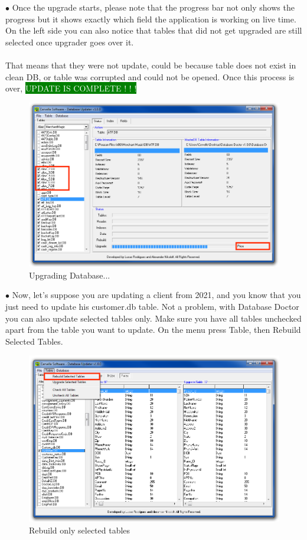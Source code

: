 \documentclass[a4paper, 11pt]{article}
\begin{document}
\vspace*{\fill}
$\bullet$ Once the upgrade starts, please note that the progress bar not only shows the progress but it shows exactly which field the application is working on live time. On the left side you can also notice that tables that did not get upgraded are still selected once upgrader goes over it. \\\\
That means that they were not update, could be because table does not exist in clean DB, or table was corrupted and could not be opened. Once this process is over, \colorbox{Green}{\textcolor{White}{UPDATE IS COMPLETE ! ! !}}
\begin{figure}[h]
    \centering
     \includegraphics[width=\textwidth]{capture 30}
    \caption{Upgrading Database...}
\end{figure}
\vspace*{\fill}

\pagebreak

\vspace*{\fill}
$\bullet$ Now, let's suppose you are updating a client from 2021, and you know that you just need to update his customer.db table. Not a problem, with Database Doctor you can also update selected tables only. Make sure you have all tables unchecked apart from the table you want to update. On the menu press Table, then Rebuild Selected Tables.
\begin{figure}[h]
    \centering
     \includegraphics[width=\textwidth]{capture 34}
    \caption{Rebuild only selected tables}
\end{figure}
\vspace*{\fill}
\end{document}
